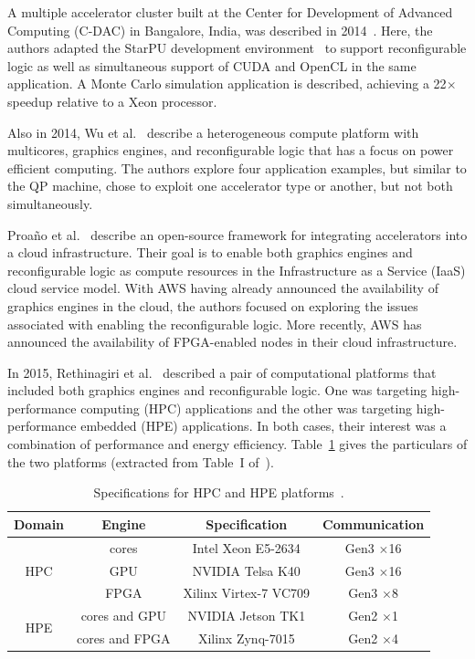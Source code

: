 A multiple accelerator cluster built at the Center for Development of
Advanced Computing (C-DAC) in Bangalore, India, was described in
2014~\cite{admb14}. Here, the authors adapted the StarPU development
environment~\cite{starpu} to support reconfigurable logic as well as
simultaneous support of CUDA and OpenCL in the same application.
A Monte Carlo simulation application is described, achieving a 22$\times$
speedup relative to a Xeon processor.

Also in 2014, Wu et al.~\cite{whk+14} describe a heterogeneous compute
platform with multicores, graphics engines, and reconfigurable logic
that has a focus on power efficient computing.
The authors explore four application examples, but similar to the QP
machine, chose to exploit one accelerator type or another, but not both
simultaneously.

Proa\~no et al.~\cite{pcc14} describe an open-source framework for
integrating accelerators into a cloud infrastructure.  Their goal is
to enable both graphics engines and reconfigurable logic as compute resources
in the Infrastructure as a Service (IaaS) cloud service model.
With AWS having already announced the availability of graphics engines
in the cloud, the authors focused on exploring the issues associated
with enabling the reconfigurable logic.
More recently, AWS has announced the availability of FPGA-enabled nodes
in their cloud infrastructure.

In 2015, Rethinagiri et al.~\cite{rpm+15} described a pair of computational
platforms that included both graphics engines and reconfigurable logic.  One
was targeting high-performance computing (HPC) applications and the other
was targeting high-performance embedded (HPE) applications.
In both cases, their interest was a combination of performance and
energy efficiency. Table~\ref{tbl:hpchpe} gives the particulars of
the two platforms (extracted from Table~I of~\cite{rpm+15}).

\begin{table}[ht]
\centering
\caption{Specifications for HPC and HPE platforms~\protect\cite{rpm+15}.}
\label{tbl:hpchpe}
\vspace{0.1in}
\begin{tabular}{c | c | c | c}
Domain & Engine & Specification & Communication \\ \hline
\multirow{3}{*}{HPC} & cores & Intel Xeon E5-2634 & Gen3 $\times$16 \\ \cline{2-4}
 & GPU & NVIDIA Telsa K40 & Gen3 $\times$16 \\ \cline{2-4}
 & FPGA & Xilinx Virtex-7 VC709 & Gen3 $\times$8 \\ \hline
\multirow{2}{*}{HPE} & cores and GPU & NVIDIA Jetson TK1 & Gen2 $\times$1 \\ \cline{2-4}
 & cores and FPGA & Xilinx Zynq-7015 & Gen2 $\times$4
\end{tabular}
\end{table}

